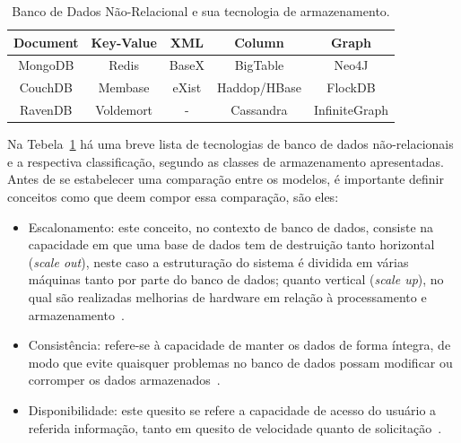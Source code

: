 \begin{table}[!htb]
\centering
\caption{Banco de Dados Não-Relacional e sua tecnologia de armazenamento.}\label{tab:01}
\begin{tabular}{c|c|c|c|c}
\hline
\textbf{Document} & \textbf{Key-Value} & \textbf{XML} & \textbf{Column} & \textbf{Graph}\\ 
\hline                               
MongoDB & Redis & BaseX & BigTable & Neo4J \\
\hline
CouchDB & Membase & eXist & Haddop/HBase & FlockDB \\
\hline
RavenDB & Voldemort & - & Cassandra & InfiniteGraph \\
\hline
\end{tabular}
\end{table}
\normalsize

Na Tebela~\ref{tab:01} há uma breve lista de tecnologias de banco de dados não-relacionais e a respectiva classificação, segundo as classes de armazenamento apresentadas.
Antes de se estabelecer uma comparação entre os modelos, é importante definir conceitos como que deem compor essa comparação, são eles:



\begin{itemize}
\item Escalonamento: este conceito, no contexto de banco de dados, consiste na capacidade em que uma base de dados tem de destruição tanto horizontal (\textit{scale out}), neste caso a estruturação do sistema é dividida em várias máquinas tanto por parte do banco de dados; quanto vertical (\textit{scale up}), no qual são realizadas melhorias de hardware em relação à processamento e armazenamento~\cite{toth2011abordagem}.

\item Consistência: refere-se à capacidade de manter os dados de forma íntegra, de modo que evite quaisquer problemas no banco de dados possam modificar ou corromper os dados armazenados~\cite{brito2010bancos}.

\item Disponibilidade: este quesito se refere a capacidade de acesso do usuário a referida informação, tanto em quesito de velocidade quanto de solicitação~\cite{brito2010bancos}.
\end{itemize}

